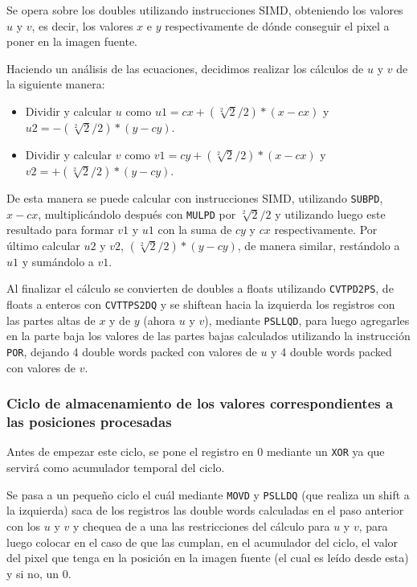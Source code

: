 Se opera sobre los doubles utilizando instrucciones SIMD, obteniendo los valores $u$ y $v$, es decir, los valores $x$ e $y$ respectivamente de dónde conseguir el pixel a poner en la imagen fuente.

Haciendo un análisis de las ecuaciones, decidimos realizar los cálculos de $u$ y $v$ de la siguiente manera:
\begin{itemize}
\item Dividir y calcular $u$ como $u1 = cx + (\sqrt[2]{2}/2) * (x-cx)$ y $u2 = -(\sqrt[2]{2}/2) * (y-cy)$.
\item Dividir y calcular $v$ como $v1 = cy + (\sqrt[2]{2}/2) * (x-cx)$ y $v2 = +(\sqrt[2]{2}/2) * (y-cy)$.
\end{itemize}

De esta manera se puede calcular con instrucciones SIMD, utilizando \texttt{SUBPD}, $x - cx$, multiplicándolo después con \texttt{MULPD} por $\sqrt[2]{2}/2$ y utilizando luego este resultado para formar $v1$ y $u1$ con la suma de $cy$ y $cx$ respectivamente. Por último calcular $u2$ y $v2$, $(\sqrt[2]{2}/2)*(y - cy)$, de manera similar, restándolo a $u1$ y sumándolo a $v1$.

Al finalizar el cálculo se convierten de doubles a floats utilizando \texttt{CVTPD2PS}, de floats a enteros con \texttt{CVTTPS2DQ} y se shiftean hacia la izquierda los registros con las partes altas de $x$ y de $y$ (ahora $u$ y $v$), mediante \texttt{PSLLQD}, para luego agregarles en la parte baja los valores de las partes bajas calculados utilizando la instrucción \texttt{POR}, dejando 4 double words packed con valores de $u$ y 4 double words packed con valores de $v$.

\subsubsection{Ciclo de almacenamiento de los valores correspondientes a las posiciones procesadas}

Antes de empezar este ciclo, se pone el registro \rbp en 0 mediante un \texttt{XOR} ya que servirá como acumulador temporal del ciclo.

Se pasa a un pequeño ciclo el cuál mediante \texttt{MOVD} y \texttt{PSLLDQ} (que realiza un shift a la izquierda) saca de los registros las double words calculadas en el paso anterior con los $u$ y $v$ y chequea de a una las restricciones del cálculo para $u$ y $v$, para luego colocar en el caso de que las cumplan, en el acumulador del ciclo, el valor del pixel que tenga en la posición en la imagen fuente (el cual es leído desde esta) y si no, un 0.

